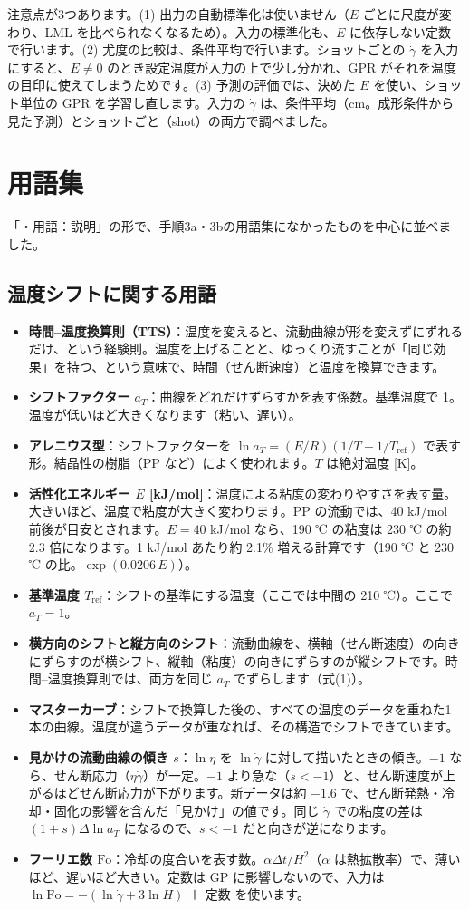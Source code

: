 \documentclass[paper=a4paper,fontsize=10.5pt,line_length=44zw,number_of_lines=38]{jlreq}
\newcommand{\gd}{\dot{\gamma}}
\newenvironment{termlist}{\begin{itemize}[label=・,leftmargin=1\zw,labelwidth=1\zw,labelsep=0pt,itemsep=0.4ex,topsep=0.6ex,parsep=0pt]}{\end{itemize}}
\newcommand{\term}[1]{\item \textbf{#1}：}
\begin{document}
注意点が3つあります。(1) 出力の自動標準化は使いません（$E$ ごとに尺度が変わり、LML を比べられなくなるため）。入力の標準化も、$E$ に依存しない定数で行います。(2) 尤度の比較は、条件平均で行います。ショットごとの $\gd$ を入力にすると、$E\ne 0$ のとき設定温度が入力の上で少し分かれ、GPR がそれを温度の目印に使えてしまうためです。(3) 予測の評価では、決めた $E$ を使い、ショット単位の GPR を学習し直します。入力の $\gd$ は、条件平均（cm。成形条件から見た予測）とショットごと（shot）の両方で調べました。

\section{用語集}

「・用語：説明」の形で、手順3a・3bの用語集になかったものを中心に並べました。

\subsection{温度シフトに関する用語}
\begin{termlist}
\term{時間–温度換算則（TTS）}温度を変えると、流動曲線が形を変えずにずれるだけ、という経験則。温度を上げることと、ゆっくり流すことが「同じ効果」を持つ、という意味で、時間（せん断速度）と温度を換算できます。
\term{シフトファクター $a_T$}曲線をどれだけずらすかを表す係数。基準温度で 1。温度が低いほど大きくなります（粘い、遅い）。
\term{アレニウス型}シフトファクターを $\ln a_T = (E/R)(1/T - 1/T_{\mathrm{ref}})$ で表す形。結晶性の樹脂（PP など）によく使われます。$T$ は絶対温度 [K]。
\term{活性化エネルギー $E$ [kJ/mol]}温度による粘度の変わりやすさを表す量。大きいほど、温度で粘度が大きく変わります。PP の流動では、40 kJ/mol 前後が目安とされます。$E = 40$ kJ/mol なら、190 ℃ の粘度は 230 ℃ の約 2.3 倍になります。1 kJ/mol あたり約 2.1\% 増える計算です（190 ℃ と 230 ℃ の比。$\exp(0.0206\,E)$）。
\term{基準温度 $T_{\mathrm{ref}}$}シフトの基準にする温度（ここでは中間の 210 ℃）。ここで $a_T = 1$。
\term{横方向のシフトと縦方向のシフト}流動曲線を、横軸（せん断速度）の向きにずらすのが横シフト、縦軸（粘度）の向きにずらすのが縦シフトです。時間–温度換算則では、両方を同じ $a_T$ でずらします（式(1)）。
\term{マスターカーブ}シフトで換算した後の、すべての温度のデータを重ねた1本の曲線。温度が違うデータが重なれば、その構造でシフトできています。
\term{見かけの流動曲線の傾き $s$}$\ln\eta$ を $\ln\gd$ に対して描いたときの傾き。$-1$ なら、せん断応力（$\eta\gd$）が一定。$-1$ より急な（$s<-1$）と、せん断速度が上がるほどせん断応力が下がります。新データは約 $-1.6$ で、せん断発熱・冷却・固化の影響を含んだ「見かけ」の値です。同じ $\gd$ での粘度の差は $(1+s)\Delta\ln a_T$ になるので、$s<-1$ だと向きが逆になります。
\term{フーリエ数 $\mathrm{Fo}$}冷却の度合いを表す数。$\alpha\Delta t/H^2$（$\alpha$ は熱拡散率）で、薄いほど、遅いほど大きい。定数は GP に影響しないので、入力は $\ln\mathrm{Fo} = -(\ln\gd + 3\ln H)$ ＋ 定数 を使います。
\end{termlist}
\end{document}
